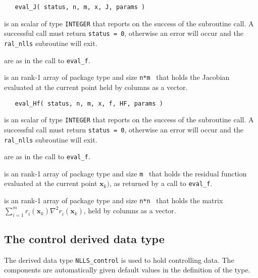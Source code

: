 \documentclass{hslspec}
\newcommand{\scalarintegerio}{is an \intentout scalar of type {\tt INTEGER} }
\newcommand{\ronearrayrealii}[1]{is an \intentin rank-1 array of package type and size {\tt #1}\ }
\newcommand{\ronearrayrealio}[1]{is an \intentout rank-1 array of package type and size {\tt #1}\ }
\newcommand{\vx}{ {\bm x} } %
\newcommand{\iter}[2][k]{ #2_{#1}^{}} %
\newcommand{\comp}[2][i]{ #2_{#1}^{}} %
\begin{document}
\begin{verbatim}
   eval_J( status, n, m, x, J, params )
\end{verbatim}

\begin{description}
   \scalarintegerio that reports on the success of the subroutine call.  
  A successful call must return {\tt status = 0}, otherwise an error will occur 
  and the {\tt ral\_nlls} subroutine will exit.

   are as in the call to {\tt eval\_f}.

  
   \ronearrayrealio{n*m} that holds the Jacobian evaluated at the current point held by columns as a vector.
  
\end{description}

\begin{verbatim}
   eval_Hf( status, n, m, x, f, HF, params )
\end{verbatim}

\begin{description}
   \scalarintegerio that reports on the success of the subroutine call.  
  A successful call must return {\tt status = 0}, otherwise an error will occur and the {\tt ral\_nlls} subroutine 
  will exit.

   are as in the call to {\tt eval\_f}.

  
   \ronearrayrealii{m} that holds the residual function
  evaluated at the current point $\vx_k)$, 
  as returned by a call to {\tt eval\_f}.

   \ronearrayrealio{n*n} that holds the matrix $\sum_{i = 1}^m \comp{r}(\iter{\vx})\nabla^2\comp{r}(\iter{\vx})$, held by columns as a vector.
  
\end{description}



\subsection{The control derived data type}
\label{typecontrol} 

The derived data type {\tt NLLS\_control} 
is used to hold controlling data. The components  are automatically 
given default values in the definition of the type.

\vspace{2mm}
\end{document}
